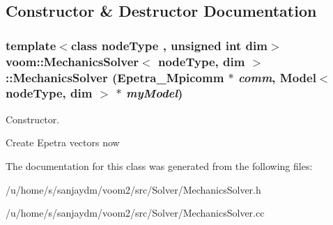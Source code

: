 \subsection{Constructor \& Destructor Documentation}
\hypertarget{classvoom_1_1_mechanics_solver_a78c3e2a12949f5ac7c0c8977c8e2adc0}{
\subsubsection[{MechanicsSolver}]{\setlength{\rightskip}{0pt plus 5cm}template$<$class nodeType , unsigned int dim$>$ {\bf voom::MechanicsSolver}$<$ nodeType, dim $>$::{\bf MechanicsSolver} (Epetra\_\-Mpicomm $\ast$ {\em comm}, \/  {\bf Model}$<$ nodeType, dim $>$ $\ast$ {\em myModel})}}
\label{classvoom_1_1_mechanics_solver_a78c3e2a12949f5ac7c0c8977c8e2adc0}


Constructor. 

Create Epetra vectors now 

The documentation for this class was generated from the following files:\begin{DoxyCompactItemize}
\item 
/u/home/s/sanjaydm/voom2/src/Solver/MechanicsSolver.h\item 
/u/home/s/sanjaydm/voom2/src/Solver/MechanicsSolver.cc\end{DoxyCompactItemize}
